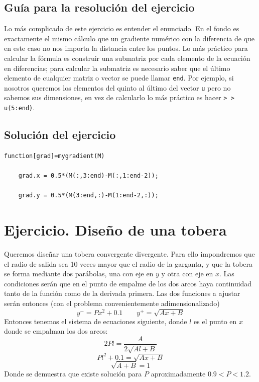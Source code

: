 \subsection{Guía para la resolución del ejercicio}

Lo más complicado de este ejercicio es entender el enunciado. En el
fondo es exactamente el mismo cálculo que un gradiente numérico con
la diferencia de que en este caso no nos importa la distancia entre
los puntos. Lo más práctico para calcular la fórmula es construir
una submatriz por cada elemento de la ecuación en diferencias; para
calcular la submatriz es necesario saber que el último elemento de
cualquier matriz o vector se puede llamar \texttt{end}. Por ejemplo,
si nosotros queremos los elementos del quinto al último del vector
\texttt{u} pero no sabemos sus dimensiones, en vez de calcularlo lo
más práctico es hacer \texttt{>\,{}> u(5:end)}.


\subsection{Solución del ejercicio}

  \begin{verbatim}
function[grad]=mygradient(M)

    grad.x = 0.5*(M(:,3:end)-M(:,1:end-2));

    grad.y = 0.5*(M(3:end,:)-M(1:end-2,:));
 \end{verbatim}


\section{Ejercicio.  Diseño de una tobera}

Queremos diseñar una tobera convergente divergente. Para ello
impondremos que el radio de salida sea 10 veces mayor que el radio de
la garganta, y que la tobera se forma mediante dos parábolas, una con
eje en $y$ y otra con eje en $x$. Las condiciones serán que en el
punto de empalme de los dos arcos haya continuidad tanto de la función
como de la derivada primera. Las dos funciones a ajustar serán
entonces (con el problema
convenientemente adimensionalizado)\\
$$y^{-}=Px^2+0.1\qquad y^{+}=\sqrt{Ax+B}$$
Entonces tenemos el sistema de ecuaciones siguiente, donde $l$ es el
punto en $x$ donde se empalman los dos arcos:
$$2Pl=\frac{A}{2\sqrt{Al+B}}$$
$$Pl^2+0.1=\sqrt{Ax+B}$$
$$\sqrt{A+B}=1$$
Donde se demuestra que existe solución para $P$ aproximadamente
$0.9<P<1.2$.

